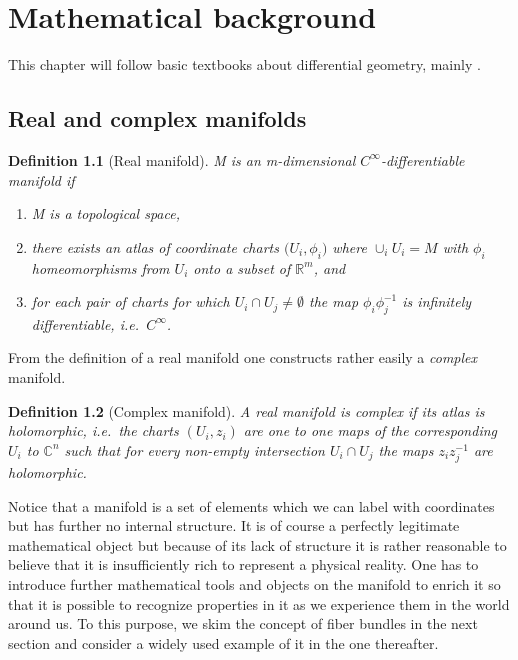 \documentclass[12pt,twoside]{book}
\newtheorem{definition}{Definition}[chapter]
\begin{document}
\newpage
\thispagestyle{empty}
\chapter{Mathematical background}
\label{ch:mathBack}

This chapter will follow basic textbooks about differential geometry, mainly \cite{isham:1999,vandoren,sternberg:1964,diffgeo-ccl,candelas,nakaharaGeo,wells:1980}.

\section{Real and complex manifolds}\label{manifolds}

\begin{definition}[Real manifold]
M is an m-dimensional $C^{\infty}$-differentiable manifold if
\begin{enumerate}
\item M is a topological space,
\item there exists an atlas of coordinate charts $\big(U_{i}, \phi_{i}\big)$ where $\cup_{i}U_{i}=M$ with $\phi_{i}$ homeomorphisms from $U_{i}$ onto a subset of $\mathbb{R}^{m}$, and
\item for each pair of charts for which $U_{i}\cap U_{j} \neq \emptyset$ the map $\phi_{i}\phi_{j}^{-1}$ is infinitely differentiable, i.e.\ $C^{\infty}$.
\end{enumerate}
\end{definition}

From the definition of a real manifold one constructs rather easily a \emph{complex} manifold. 
\begin{definition}[Complex manifold]\label{defCM}
A real manifold is complex if its atlas is holomorphic, i.e.\ the charts $\left(U_{i},z_{i}\right)$ are one to one maps of the corresponding $U_{i}$ to $\mathbb{C}^{n}$ such that for every non-empty intersection $U_{i}\cap U_{j}$ the maps $z_{i}z_{j}^{-1}$ are holomorphic.
\end{definition}

Notice that a manifold is a set of elements which we can label with coordinates but has further no internal structure. It is of course a perfectly legitimate mathematical object but because of its lack of structure it is rather reasonable to believe that it is insufficiently rich to represent a physical reality. One has to introduce further mathematical tools and objects on the manifold to enrich it so that it is possible to recognize properties in it as we experience them in the world around us. To this purpose, we skim the concept of fiber bundles in the next section and consider a widely used example of it in the one thereafter.
\end{document}
